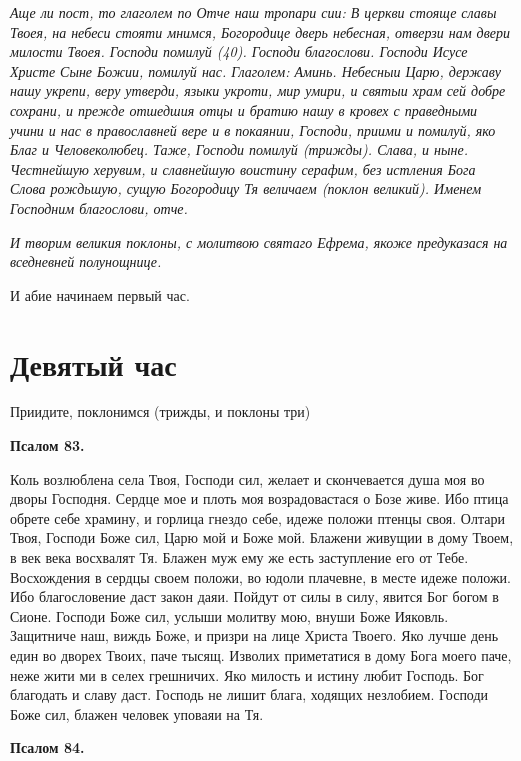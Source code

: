 \itshape Аще ли пост, то глаголем по Отче наш тропари сии:\normalfont{} В церкви стояще славы Твоея, на небеси стояти мнимся, Богородице дверь небесная, отверзи нам двери милости Твоея. Господи помилуй (40). Господи благослови. Господи Исусе Христе Сыне Божии, помилуй нас. Глаголем: Аминь. Небесныи Царю, державу нашу укрепи, веру утверди, языки укроти, мир умири, и святыи храм сей добре сохрани, и прежде отшедшия отцы и братию нашу в кровех с праведными учини и нас в православней вере и в покаянии, Господи, приими и помилуй, яко Благ и Человеколюбец. Таже, Господи помилуй (трижды). Слава, и ныне. Честнейшую херувим, и славнейшую воистину серафим, без истления Бога Слова рождьшую, сущую Богородицу Тя величаем (поклон великий). Именем Господним благослови, отче.


\itshape И творим великия поклоны, с молитвою святаго Ефрема, якоже предуказася на вседневней полунощнице. 

И абие начинаем первый час.\normalfont{}


\section{Девятый час}
 


Приидите, поклонимся (трижды, и поклоны три)


\medskip


\bfseries Псалом 83.\normalfont{}


Коль возлюблена села Твоя, Господи сил, желает и скончевается душа моя во дворы Господня. Сердце мое и плоть моя возрадовастася о Бозе живе. Ибо птица обрете себе храмину, и горлица гнездо себе, идеже положи птенцы своя. Олтари Твоя, Господи Боже сил, Царю мой и Боже мой. Блажени живущии в дому Твоем, в век века восхвалят Тя. Блажен муж ему же есть заступление его от Тебе. Восхождения в сердцы своем положи, во юдоли плачевне, в месте идеже положи. Ибо благословение даст закон даяи. Пойдут от силы в силу, явится Бог богом в Сионе. Господи Боже сил, услыши молитву мою, внуши Боже Ияковль. Защитниче наш, виждь Боже, и призри на лице Христа Твоего. Яко лучше день един во дворех Твоих, паче тысящ. Изволих приметатися в дому Бога моего паче, неже жити ми в селех грешничих. Яко милость и истину любит Господь. Бог благодать и славу даст. Господь не лишит блага, ходящих незлобием. Господи Боже сил, блажен человек уповаяи на Тя.


\medskip


\bfseries Псалом 84.\normalfont{}


